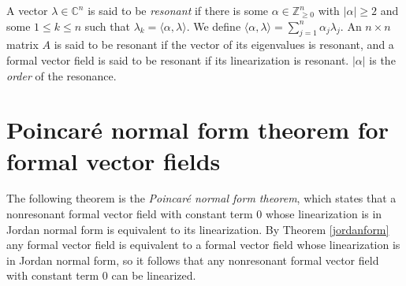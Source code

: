 \documentclass{article}
\begin{document}
A vector $\lambda \in \mathbb{C}^n$ is said to be {\em resonant} if there is some $\alpha \in \mathbb{Z}^n_{\geq 0}$ with
$|\alpha| \geq 2$ and some $1 \leq k \leq n$ such that $\lambda_k = \langle \alpha, \lambda \rangle$.
We define $\langle \alpha,\lambda \rangle=\sum_{j=1}^n \alpha_j \lambda_j$.
An $n \times n$ matrix $A$ is said to be resonant if the vector of its eigenvalues 
is resonant, and a formal vector field is said to be resonant if its linearization is resonant. $|\alpha|$ is the {\em order} of the resonance.

\section{Poincar\'e normal form theorem for formal vector fields}
The following theorem is the {\em Poincar\'e normal form theorem}, which states that a nonresonant formal vector field with constant term $0$ whose linearization is in Jordan normal form is equivalent to its linearization. By Theorem \ref{jordanform} any formal vector field is equivalent to a formal vector field whose linearization is in Jordan normal form,
so it follows that any nonresonant formal vector field with constant term $0$ can be linearized.
\end{document}
